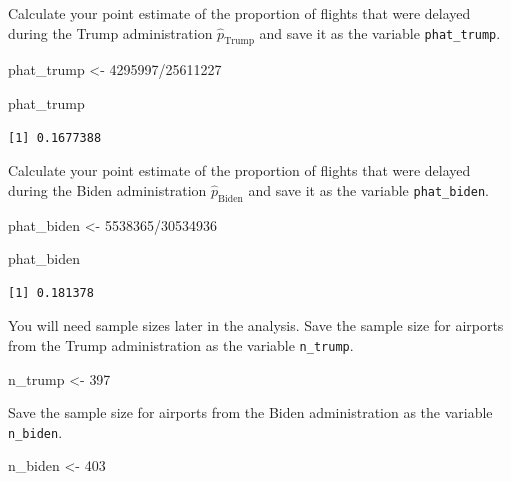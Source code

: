 \documentclass[
  letterpaper,
  DIV=11,
  numbers=noendperiod]{scrartcl}
\newenvironment{Shaded}{\begin{snugshade}}{\end{snugshade}}
\newcommand{\DecValTok}[1]{\textcolor[rgb]{0.68,0.00,0.00}{#1}}
\newcommand{\NormalTok}[1]{\textcolor[rgb]{0.00,0.23,0.31}{#1}}
\newcommand{\OtherTok}[1]{\textcolor[rgb]{0.00,0.23,0.31}{#1}}
\newcommand{\SpecialCharTok}[1]{\textcolor[rgb]{0.37,0.37,0.37}{#1}}
\begin{document}
Calculate your point estimate of the proportion of flights that were
delayed during the Trump administration \(\hat{p}_{\text{Trump}}\) and
save it as the variable \texttt{phat\_trump}.

\begin{Shaded}
\begin{Highlighting}[]
\NormalTok{phat\_trump }\OtherTok{\textless{}{-}} \DecValTok{4295997}\SpecialCharTok{/}\DecValTok{25611227}

\NormalTok{phat\_trump}
\end{Highlighting}
\end{Shaded}

\begin{verbatim}
[1] 0.1677388
\end{verbatim}

Calculate your point estimate of the proportion of flights that were
delayed during the Biden administration \(\hat{p}_{\text{Biden}}\) and
save it as the variable \texttt{phat\_biden}.

\begin{Shaded}
\begin{Highlighting}[]
\NormalTok{phat\_biden }\OtherTok{\textless{}{-}} \DecValTok{5538365}\SpecialCharTok{/}\DecValTok{30534936}

\NormalTok{phat\_biden}
\end{Highlighting}
\end{Shaded}

\begin{verbatim}
[1] 0.181378
\end{verbatim}

You will need sample sizes later in the analysis. Save the sample size
for airports from the Trump administration as the variable
\texttt{n\_trump}.

\begin{Shaded}
\begin{Highlighting}[]
\NormalTok{n\_trump }\OtherTok{\textless{}{-}} \DecValTok{397}
\end{Highlighting}
\end{Shaded}

Save the sample size for airports from the Biden administration as the
variable \texttt{n\_biden}.

\begin{Shaded}
\begin{Highlighting}[]
\NormalTok{n\_biden }\OtherTok{\textless{}{-}} \DecValTok{403}
\end{Highlighting}
\end{Shaded}
\end{document}
